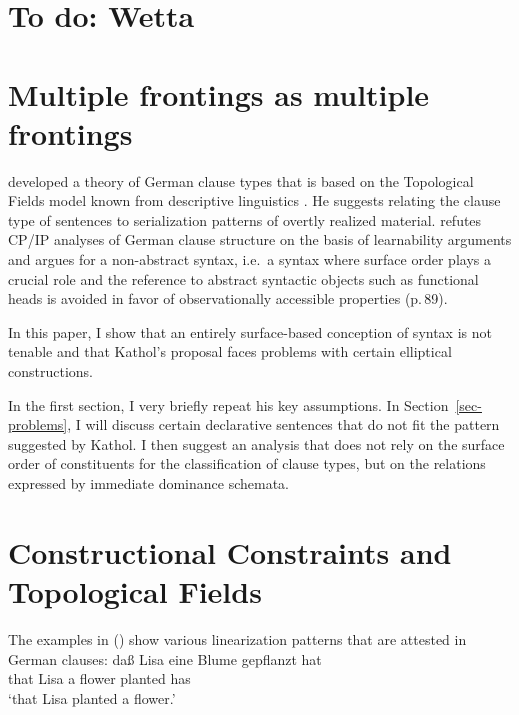 \section{To do: Wetta}

\citet{Wetta2011a}


\section{Multiple frontings as multiple frontings}

\citet{Mueller2000d}



\citet{Kathol95a,Kathol97a,Kathol2000a,Kathol2001a} developed a theory of German clause types that
is based on the Topological Fields model known from descriptive linguistics 
\citep{Drach37,Reis80a,Hoehle86,Askedal86}. He suggests relating the clause type of sentences 
to serialization patterns of overtly realized material. \citet{Kathol97a} refutes
CP/IP analyses of German clause structure on the basis of learnability arguments and
argues for a non-abstract syntax, i.e.\ a syntax where surface
order plays a crucial role and the reference to abstract syntactic objects such as
functional heads is avoided in favor of observationally accessible properties (p.\,89).

In this paper, I show that an entirely surface-based conception of syntax is not tenable and
that Kathol's proposal faces problems with certain elliptical constructions.

In the first section, I very briefly repeat his key assumptions. In Section~\ref{sec-problems}, I will
discuss certain declarative sentences that do not fit the
pattern suggested by Kathol. I then suggest an analysis that
does not rely on the surface order of constituents for the classification of clause types,
but on the relations expressed by immediate dominance schemata.

\section{Constructional Constraints and Topological Fields}

The examples in () show various linearization patterns that are
attested in German clauses:
\eal
\ex
\gll daß Lisa eine Blume gepflanzt hat\\
     that Lisa a flower planted has\\
\glt `that Lisa planted a flower.'

